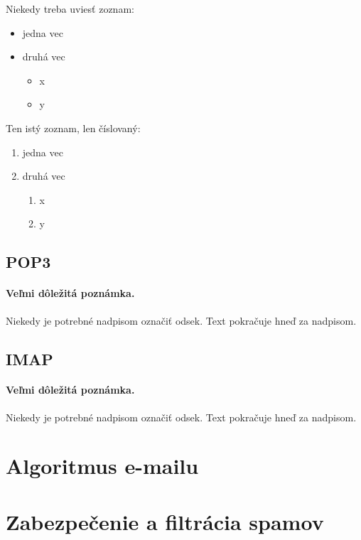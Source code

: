 \documentclass[10pt,slovak,twoside,a4paper]{article}
\begin{document}
Niekedy treba uviesť zoznam:

\begin{itemize}
\item jedna vec
\item druhá vec
	\begin{itemize}
	\item x
	\item y
	\end{itemize}
\end{itemize}

Ten istý zoznam, len číslovaný:

\begin{enumerate}
\item jedna vec
\item druhá vec
	\begin{enumerate}
	\item x
	\item y
	\end{enumerate}
\end{enumerate}


\subsection{POP3} \label{ina:este}

\paragraph{Veľmi dôležitá poznámka.}
Niekedy je potrebné nadpisom označiť odsek. Text pokračuje hneď za nadpisom.

\subsection{IMAP} \label{ina:este}

\paragraph{Veľmi dôležitá poznámka.}
Niekedy je potrebné nadpisom označiť odsek. Text pokračuje hneď za nadpisom.

\section{Algoritmus e-mailu} 

\section{Zabezpečenie a filtrácia spamov} 
\end{document}
